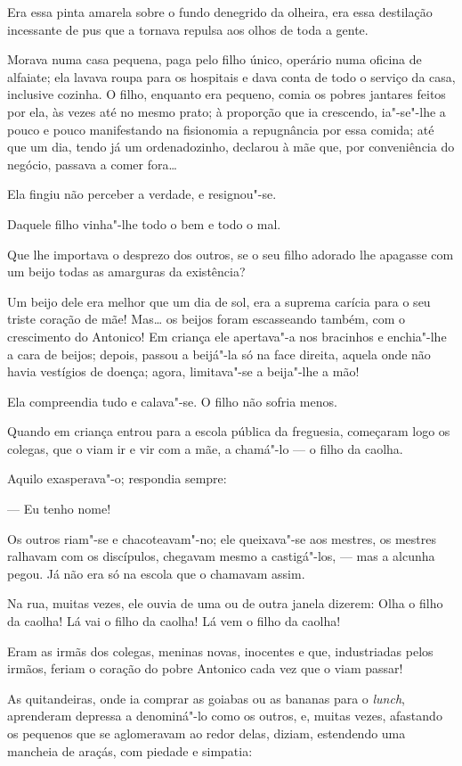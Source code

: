 Era essa pinta amarela sobre o fundo denegrido da olheira, era essa
destilação incessante de pus que a tornava repulsa aos olhos de toda a
gente.

Morava numa casa pequena, paga pelo filho único, operário numa oficina
de alfaiate; ela lavava roupa para os hospitais e dava conta de todo o
serviço da casa, inclusive cozinha. O filho, enquanto era pequeno, comia
os pobres jantares feitos por ela, às vezes até no mesmo prato; à
proporção que ia crescendo, ia"-se"-lhe a pouco e pouco manifestando na
fisionomia a repugnância por essa comida; até que um dia, tendo já um
ordenadozinho, declarou à mãe que, por conveniência do negócio, passava
a comer fora\ldots{}

Ela fingiu não perceber a verdade, e resignou"-se.

Daquele filho vinha"-lhe todo o bem e todo o mal.

Que lhe importava o desprezo dos outros, se o seu filho adorado lhe
apagasse com um beijo todas as amarguras da existência?

Um beijo dele era melhor que um dia de sol, era a suprema carícia para o
seu triste coração de mãe! Mas\ldots{} os beijos foram escasseando também,
com o crescimento do Antonico! Em criança ele apertava"-a nos bracinhos e
enchia"-lhe a cara de beijos; depois, passou a beijá"-la só na face
direita, aquela onde não havia vestígios de doença; agora, limitava"-se a
beija"-lhe a mão!

Ela compreendia tudo e calava"-se. O filho não sofria menos.

Quando em criança entrou para a escola pública da freguesia, começaram
logo os colegas, que o viam ir e vir com a mãe, a chamá"-lo --- o filho
da caolha.

Aquilo exasperava"-o; respondia sempre:

--- Eu tenho nome!

Os outros riam"-se e chacoteavam"-no; ele queixava"-se aos mestres, os
mestres ralhavam com os discípulos, chegavam mesmo a castigá"-los, ---
mas a alcunha pegou. Já não era só na escola que o chamavam assim.

Na rua, muitas vezes, ele ouvia de uma ou de outra janela dizerem: Olha
o filho da caolha! Lá vai o filho da caolha! Lá vem o filho da caolha!

Eram as irmãs dos colegas, meninas novas, inocentes e que, industriadas
pelos irmãos, feriam o coração do pobre Antonico cada vez que o viam
passar!

As quitandeiras, onde ia comprar as goiabas ou as bananas para o
\emph{lunch}, aprenderam depressa a denominá"-lo como os outros, e,
muitas vezes, afastando os pequenos que se aglomeravam ao redor delas,
diziam, estendendo uma mancheia de araçás, com piedade e simpatia:

